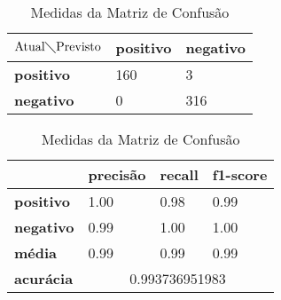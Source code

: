 \begin{table}[h!]
\centering
\begin{minipage}[b]{0.45\linewidth}
\caption{Matriz de Confusão Binário: \textit{SVM}}
\label{tab:mcb-nb}
\begin{tabular}{|l|l|l|}
\hline
$\textrm{Atual}\diagdown\textrm{Previsto}$ & \textbf{positivo} & \textbf{negativo}\\ \hline
\textbf{positivo} & 160 & 3\\ \hline
\textbf{negativo} & 0 & 316\\ \hline
\end{tabular}
\end{minipage}
\hspace{0.5cm}
\begin{minipage}[b]{0.45\linewidth}

\centering
\caption{Medidas da Matriz de Confusão}
\label{tab:mmcb-nb}
\begin{tabular}{|l|l|l|l|}
\hline
         & \textbf{precisão} & \textbf{recall} & \textbf{f1-score} \\ \hline
\textbf{positivo} & 1.00     & 0.98   & 0.99     \\ \hline
\textbf{negativo} & 0.99     & 1.00   & 1.00     \\ \hline
\textbf{média} & 0.99     & 0.99   & 0.99     \\ \hline
\textbf{acurácia} & \multicolumn{3}{|c|}{0.993736951983}\\ \hline
\end{tabular}
\end{minipage}
\end{table}

